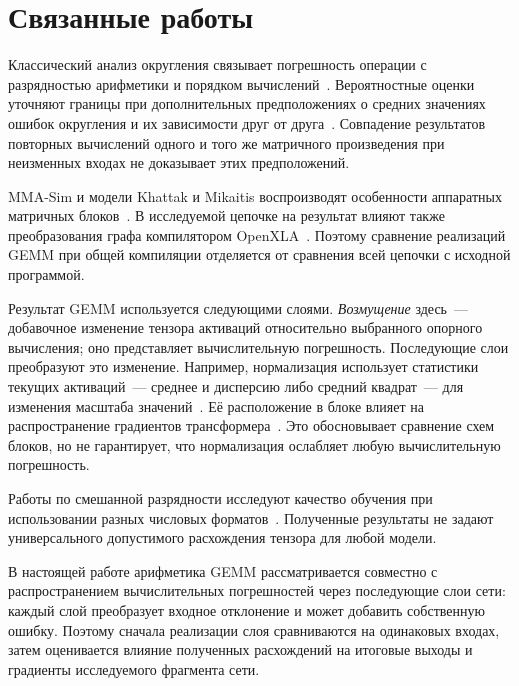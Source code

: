 \section{Связанные работы}
\label{sec:related}

Классический анализ округления связывает погрешность операции
с разрядностью арифметики и порядком вычислений~\cite{Wilkinson1963,Higham2002,Goldberg1991}.
Вероятностные оценки уточняют границы при дополнительных предположениях
о средних значениях ошибок округления и их зависимости
друг от друга~\cite{HighamMary2019}.
Совпадение результатов повторных вычислений одного и того же матричного
произведения при неизменных входах не доказывает этих предположений.

MMA-Sim и модели Khattak и Mikaitis воспроизводят особенности
аппаратных матричных блоков~\cite{MMASim2025,Khattak2025}.
В исследуемой цепочке на результат влияют также преобразования графа
компилятором OpenXLA~\cite{OpenXLA2023}.
Поэтому сравнение реализаций GEMM при общей компиляции отделяется
от сравнения всей цепочки с исходной программой.

Результат GEMM используется следующими слоями.
\emph{Возмущение} здесь~--- добавочное изменение тензора активаций
относительно выбранного опорного вычисления; оно представляет
вычислительную погрешность. Последующие слои преобразуют это изменение.
Например, нормализация использует статистики текущих активаций~---
среднее и дисперсию либо средний квадрат~--- для изменения
масштаба значений~\cite{Ba2016,Zhang2019}.
Её расположение в блоке влияет на распространение градиентов
трансформера~\cite{Xiong2020,Wang2022}.
Это обосновывает сравнение схем блоков, но не гарантирует,
что нормализация ослабляет любую вычислительную погрешность.

Работы по смешанной разрядности исследуют качество обучения при
использовании разных числовых форматов~\cite{Micikevicius2018,Wang2018FP8}.
Полученные результаты не задают универсального допустимого расхождения
тензора для любой модели.

В настоящей работе арифметика GEMM рассматривается совместно
с распространением вычислительных погрешностей через последующие слои
сети: каждый слой преобразует входное отклонение и может добавить
собственную ошибку. Поэтому сначала реализации слоя сравниваются
на одинаковых входах, затем оценивается влияние полученных расхождений
на итоговые выходы и градиенты исследуемого фрагмента сети.
